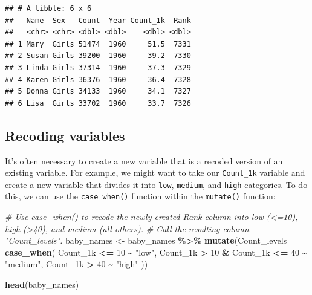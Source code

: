 \documentclass[
]{book}
\newenvironment{Shaded}{\begin{snugshade}}{\end{snugshade}}
\newcommand{\CommentTok}[1]{\textcolor[rgb]{0.56,0.35,0.01}{\textit{#1}}}
\newcommand{\DataTypeTok}[1]{\textcolor[rgb]{0.13,0.29,0.53}{#1}}
\newcommand{\DecValTok}[1]{\textcolor[rgb]{0.00,0.00,0.81}{#1}}
\newcommand{\KeywordTok}[1]{\textcolor[rgb]{0.13,0.29,0.53}{\textbf{#1}}}
\newcommand{\NormalTok}[1]{#1}
\newcommand{\OperatorTok}[1]{\textcolor[rgb]{0.81,0.36,0.00}{\textbf{#1}}}
\newcommand{\StringTok}[1]{\textcolor[rgb]{0.31,0.60,0.02}{#1}}
\begin{document}
\begin{verbatim}
## # A tibble: 6 x 6
##   Name  Sex   Count  Year Count_1k  Rank
##   <chr> <chr> <dbl> <dbl>    <dbl> <dbl>
## 1 Mary  Girls 51474  1960     51.5  7331
## 2 Susan Girls 39200  1960     39.2  7330
## 3 Linda Girls 37314  1960     37.3  7329
## 4 Karen Girls 36376  1960     36.4  7328
## 5 Donna Girls 34133  1960     34.1  7327
## 6 Lisa  Girls 33702  1960     33.7  7326
\end{verbatim}

\hypertarget{recoding-variables}{%
\subsection{Recoding variables}\label{recoding-variables}}

It's often necessary to create a new variable that is a recoded version of an existing variable. For example, we might want to take our \texttt{Count\_1k} variable and create a new variable that divides it into \texttt{low}, \texttt{medium}, and \texttt{high} categories. To do this, we can use the \texttt{case\_when()} function within the \texttt{mutate()} function:

\begin{Shaded}
\begin{Highlighting}[]
\CommentTok{\# Use case\_when() to recode the newly created Rank column into low (\textless{}=10), high (\textgreater{}40), and medium (all others).}
\CommentTok{\# Call the resulting column "Count\_levels".}
\NormalTok{baby\_names \textless{}{-}}
\StringTok{  }\NormalTok{baby\_names }\OperatorTok{\%\textgreater{}\%}
\StringTok{  }\KeywordTok{mutate}\NormalTok{(}\DataTypeTok{Count\_levels =} \KeywordTok{case\_when}\NormalTok{(}
\NormalTok{                            Count\_1k }\OperatorTok{\textless{}=}\StringTok{ }\DecValTok{10}                  \OperatorTok{\textasciitilde{}}\StringTok{ "low"}\NormalTok{,}
\NormalTok{                            Count\_1k  }\OperatorTok{\textgreater{}}\StringTok{ }\DecValTok{10} \OperatorTok{\&}\StringTok{ }\NormalTok{Count\_1k }\OperatorTok{\textless{}=}\StringTok{ }\DecValTok{40} \OperatorTok{\textasciitilde{}}\StringTok{ "medium"}\NormalTok{,}
\NormalTok{                            Count\_1k  }\OperatorTok{\textgreater{}}\StringTok{ }\DecValTok{40}                  \OperatorTok{\textasciitilde{}}\StringTok{ "high"}
\NormalTok{                            ))}

\KeywordTok{head}\NormalTok{(baby\_names)                            }
\end{Highlighting}
\end{Shaded}
\end{document}
